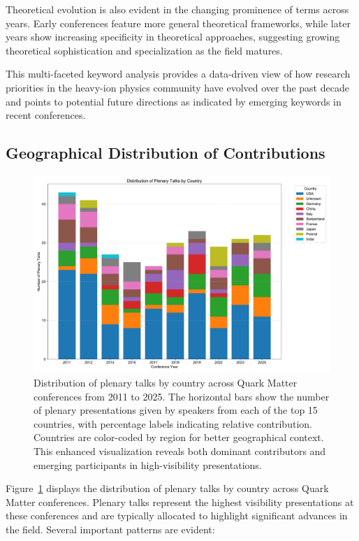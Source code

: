 \documentclass[a4paper,11pt]{article}
\begin{document}
Theoretical evolution is also evident in the changing prominence of terms across years. Early conferences feature more general theoretical frameworks, while later years show increasing specificity in theoretical approaches, suggesting growing theoretical sophistication and specialization as the field matures.

This multi-faceted keyword analysis provides a data-driven view of how research priorities in the heavy-ion physics community have evolved over the past decade and points to potential future directions as indicated by emerging keywords in recent conferences.

\subsection{Geographical Distribution of Contributions}

\begin{figure}[H]
\centering
\includegraphics[width=\textwidth]{figures/plenary_talks_by_country.pdf}
\caption{Distribution of plenary talks by country across Quark Matter conferences from 2011 to 2025. The horizontal bars show the number of plenary presentations given by speakers from each of the top 15 countries, with percentage labels indicating relative contribution. Countries are color-coded by region for better geographical context. This enhanced visualization reveals both dominant contributors and emerging participants in high-visibility presentations.}
\label{fig:country_plenary}
\end{figure}

Figure~\ref{fig:country_plenary} displays the distribution of plenary talks by country across Quark Matter conferences. Plenary talks represent the highest visibility presentations at these conferences and are typically allocated to highlight significant advances in the field. Several important patterns are evident:
\end{document}
